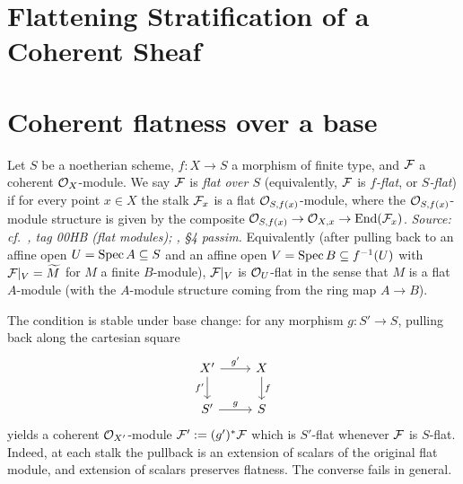 \section{Flattening Stratification of a Coherent Sheaf}
\label{mk-chap:Picard_FlatteningStratification}

\section{Coherent flatness over a base}
\label{mk-sec:coh_flat}

\begin{definition}\label{mk-def:coherent_sheaf_flat}
  \leanok

  Let \(S\) be a noetherian scheme, \(f : X \to S\) a morphism of finite type, and
  \(\mathcal{F}\) a coherent \(\mathcal{O}_X\)-module.  We say \(\mathcal{F}\) is \emph{flat over \(S\)}
  (equivalently, \(\mathcal{F}\) is \emph{\(f\)-flat}, or \emph{\(S\)-flat}) if for every
  point \(x \in X\) the stalk \(\mathcal{F}_x\) is a flat \(\mathcal{O}_{S, f(x)}\)-module, where the
  \(\mathcal{O}_{S, f(x)}\)-module structure is given by the composite
  \(\mathcal{O}_{S, f(x)} \to \mathcal{O}_{X, x} \to \operatorname{End}(\mathcal{F}_x)\).
  \textit{Source: cf.\ \cite{stacks-project}, tag 00HB (flat modules); \cite{nitsure-hilbert-quot}, \S4
  passim.}
  Equivalently (after pulling back to an affine open \(U = \operatorname{Spec} A \subseteq S\) and
  an affine open \(V = \operatorname{Spec} B \subseteq f^{-1}(U)\) with \(\mathcal{F}|_V = \widetilde{M}\)
  for \(M\) a finite \(B\)-module), \(\mathcal{F}|_V\) is \(\mathcal{O}_U\)-flat in the sense that \(M\) is a
  flat \(A\)-module (with the \(A\)-module structure coming from the ring map
  \(A \to B\)).
\end{definition}

\begin{remark}
\label{mk-rem:coh_flat_pullback}
  The condition is stable under base change: for any morphism \(g : S' \to S\),
  pulling back along the cartesian square
  \[
    \begin{tikzcd}
      X' \ar[r, "g'"] \ar[d, "f'"'] & X \ar[d, "f"] \\
      S' \ar[r, "g"]                & S
    \end{tikzcd}
  \]
  yields a coherent \(\mathcal{O}_{X'}\)-module \(\mathcal{F}' := (g')^* \mathcal{F}\) which is \(S'\)-flat
  whenever \(\mathcal{F}\) is \(S\)-flat.  Indeed, at each stalk the pullback is an
  extension of scalars of the original flat module, and extension of scalars
  preserves flatness. The converse fails in general.
\end{remark}

